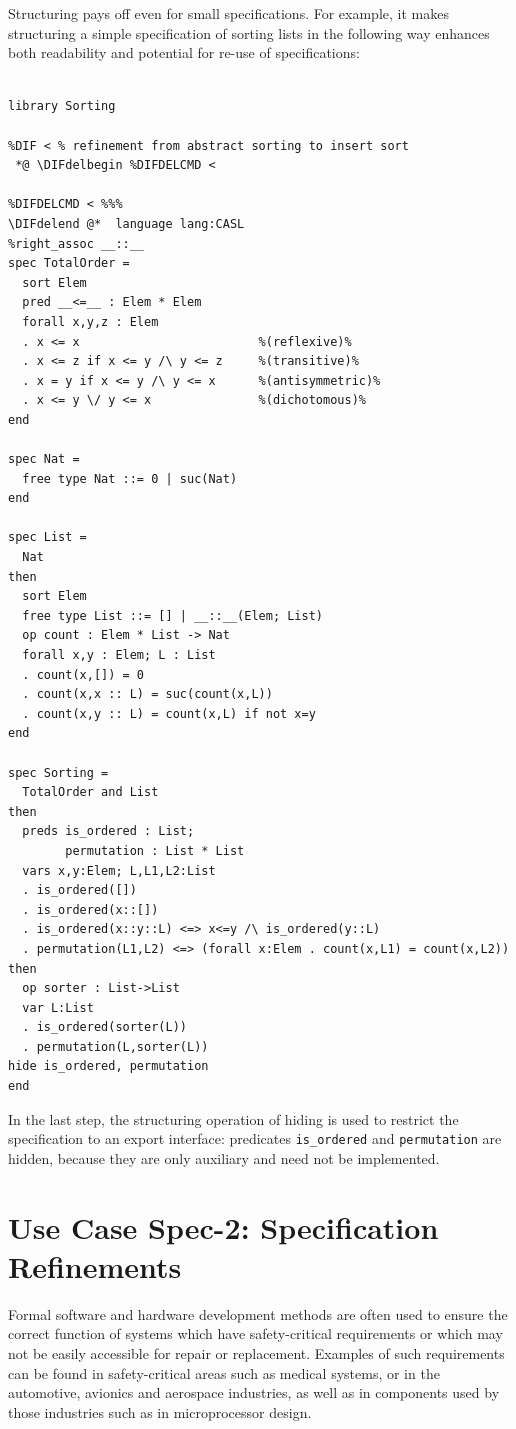 \documentclass[10pt,fleqn,final]{scrreprt}
\providecommand{\DIFdelbegin}{} %
\providecommand{\DIFdelend}{} %
\begin{document}
Structuring pays off even for small specifications. For example, it makes
structuring a simple specification of sorting lists in the 
following way enhances both readability and potential for re-use
of specifications:

\begin{lstlisting}[basicstyle=\ttfamily\footnotesize,language=dolText,alsolanguage=CASL,escapechar=@,mathescape]	
%prefix( lang:  <http://purl.net/DOL/languages/> )%

library Sorting

%DIF < % refinement from abstract sorting to insert sort
 *@ \DIFdelbegin %DIFDELCMD < 

%DIFDELCMD < %%%
\DIFdelend @*  language lang:CASL
%right_assoc __::__
spec TotalOrder =
  sort Elem
  pred __<=__ : Elem * Elem
  forall x,y,z : Elem
  . x <= x                         %(reflexive)%
  . x <= z if x <= y /\ y <= z     %(transitive)%
  . x = y if x <= y /\ y <= x      %(antisymmetric)%
  . x <= y \/ y <= x               %(dichotomous)%
end

spec Nat =
  free type Nat ::= 0 | suc(Nat)
end

spec List =
  Nat
then
  sort Elem
  free type List ::= [] | __::__(Elem; List)
  op count : Elem * List -> Nat
  forall x,y : Elem; L : List
  . count(x,[]) = 0
  . count(x,x :: L) = suc(count(x,L))
  . count(x,y :: L) = count(x,L) if not x=y
end

spec Sorting =
  TotalOrder and List
then
  preds is_ordered : List;
        permutation : List * List
  vars x,y:Elem; L,L1,L2:List
  . is_ordered([])
  . is_ordered(x::[])
  . is_ordered(x::y::L) <=> x<=y /\ is_ordered(y::L)
  . permutation(L1,L2) <=> (forall x:Elem . count(x,L1) = count(x,L2))
then
  op sorter : List->List
  var L:List
  . is_ordered(sorter(L))
  . permutation(L,sorter(L))
hide is_ordered, permutation
end
\end{lstlisting}

In the last step, the structuring operation of hiding is used to
restrict the specification to an export interface: 
 predicates \texttt{is\_ordered} and \texttt{permutation} are hidden, because they
are only auxiliary and need not be implemented.


\section{Use Case Spec-2: Specification Refinements}\label{spec-2}
Formal software and hardware development methods are often used to
ensure the correct function of systems which have safety-critical
requirements or which may not be easily accessible for repair or
replacement.  Examples of such requirements can be found in
safety-critical areas such as medical systems, or in the automotive,
avionics and aerospace industries, as well as in components used by
those industries such as in microprocessor design.
\end{document}
